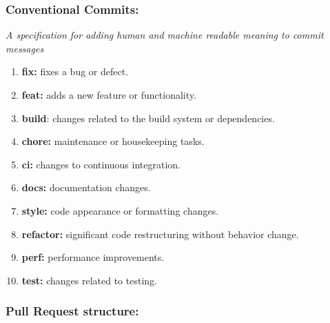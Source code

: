 \documentclass{article}
\providecommand{\tightlist}{
  \setlength{\itemsep}{0pt}\setlength{\parskip}{0pt}}
\begin{document}
\hypertarget{conventionalcommits}{
\subsubsection{Conventional Commits:}\label{conventionalcommits}}

\emph{A specification for adding human and machine readable meaning to
commit messages}

\begin{enumerate}
\tightlist
\item
  \textbf{fix:} fixes a bug or defect.
\item
  \textbf{feat:} adds a new feature or functionality.
\item
  \textbf{build}: changes related to the build system or dependencies.
\item
  \textbf{chore:} maintenance or housekeeping tasks.
\item
  \textbf{ci:} changes to continuous integration.
\item
  \textbf{docs:} documentation changes.
\item
  \textbf{style:} code appearance or formatting changes.
\item
  \textbf{refactor:} significant code restructuring without behavior
  change.
\item
  \textbf{perf:} performance improvements.
\item
  \textbf{test:} changes related to testing.
\end{enumerate}

\hypertarget{pullrequeststructurenbsp}{
\subsubsection{Pull Request
structure:~}\label{pullrequeststructurenbsp}}
\end{document}
